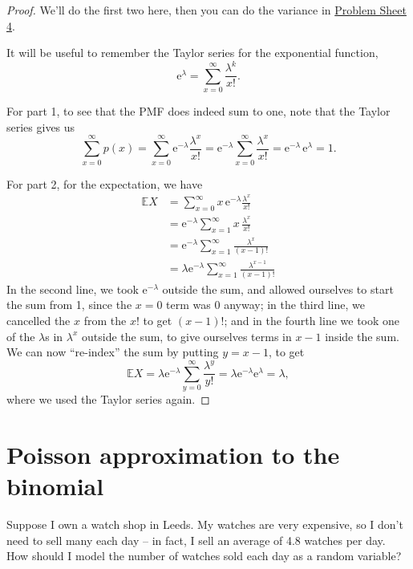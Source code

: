 \documentclass[
  a4paper,
]{book}
\theoremstyle{definition}
\theoremstyle{definition}
\theoremstyle{definition}
\theoremstyle{definition}
\theoremstyle{remark}
\begin{document}
\begin{proof}
We'll do the first two here, then you can do the variance in \protect\hyperlink{P4-long}{Problem Sheet 4}.

It will be useful to remember the Taylor series for the exponential function,
\[ \mathrm e^\lambda = \sum_{x=0}^\infty \frac{\lambda^k}{x!} . \]

For part 1, to see that the PMF does indeed sum to one, note that the Taylor series gives us
\[ \sum_{x=0}^\infty p(x) = \sum_{x=0}^\infty \mathrm e^{-\lambda} \frac{\lambda^x}{x!}
= \mathrm e^{-\lambda} \sum_{x=0}^\infty  \frac{\lambda^x}{x!} = \mathrm e^{-\lambda}\,\mathrm e^{\lambda} = 1. \]

For part 2, for the expectation, we have
\begin{align*}
\mathbb EX &= \sum_{x=0}^\infty x\,\mathrm e^{-\lambda}  \frac{\lambda^x}{x!} \\
  &= \mathrm e^{-\lambda} \sum_{x=1}^\infty x\,\frac{\lambda^x}{x!} \\
  &= \mathrm e^{-\lambda} \sum_{x=1}^\infty \frac{\lambda^x}{(x-1)!} \\
  &= \lambda \mathrm e^{-\lambda} \sum_{x=1}^\infty \frac{\lambda^{x-1}}{(x-1)!}
\end{align*}
In the second line, we took \(\mathrm e^{-\lambda}\) outside the sum, and allowed ourselves to start the sum from 1, since the \(x = 0\) term was 0 anyway; in the third line, we cancelled the \(x\) from the \(x!\) to get \((x-1)!\); and in the fourth line we took one of the \(\lambda\)s in \(\lambda^x\) outside the sum, to give ourselves terms in \(x - 1\) inside the sum. We can now ``re-index'' the sum by putting \(y = x - 1\), to get
\[ \mathbb EX = \lambda \mathrm e^{-\lambda} \sum_{y=0}^\infty \frac{\lambda^{y}}{y!}
= \lambda \mathrm e^{-\lambda} \mathrm e^{\lambda} = \lambda , \]
where we used the Taylor series again.
\end{proof}

\hypertarget{poisson-approx}{%
\section{Poisson approximation to the binomial}\label{poisson-approx}}

Suppose I own a watch shop in Leeds. My watches are very expensive, so I don't need to sell many each day -- in fact, I sell an average of 4.8 watches per day. How should I model the number of watches sold each day as a random variable?
\end{document}

